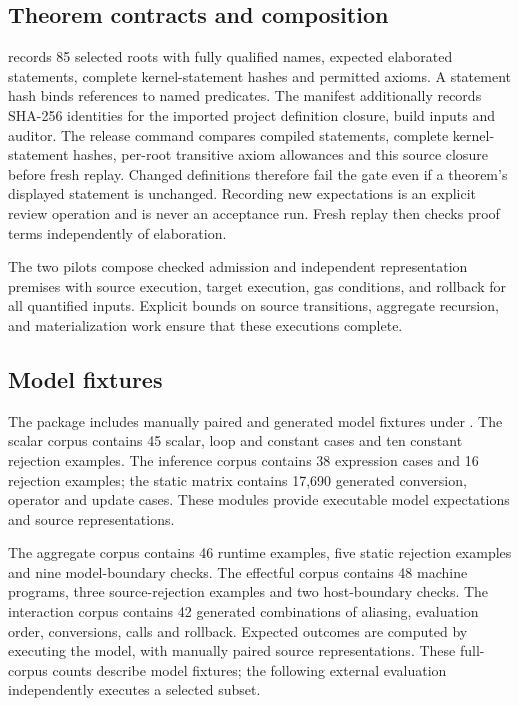 \documentclass[conference]{IEEEtran}
\begin{document}
\subsection{Theorem contracts and composition}
 records 85 selected roots with fully qualified names,
expected elaborated statements, complete kernel-statement hashes and permitted
axioms. A statement hash binds references to named predicates. The manifest additionally
records SHA-256 identities for the imported project definition closure, build
inputs and auditor. The release command compares compiled statements,
complete kernel-statement hashes, per-root transitive axiom allowances and this
source closure before fresh replay. Changed definitions therefore fail the gate
even if a theorem's displayed statement is unchanged. Recording new expectations
is an explicit review operation and is never an acceptance run. Fresh replay
then checks proof terms independently of elaboration.

The two pilots compose checked admission and independent representation
premises with source execution, target execution, gas conditions, and rollback
for all quantified inputs. Explicit bounds on source transitions, aggregate
recursion, and materialization work ensure that these executions complete.

\subsection{Model fixtures}
The package includes manually paired and generated model fixtures under
. The scalar corpus contains 45 scalar, loop and
constant cases and ten constant rejection examples. The inference corpus
contains 38 expression cases and 16 rejection examples; the static matrix
contains 17,690 generated conversion, operator and update cases. These modules
provide executable model expectations and source representations.

The aggregate corpus contains 46 runtime examples, five static rejection
examples and nine model-boundary checks. The effectful corpus contains 48
machine programs, three source-rejection examples and two host-boundary checks.
The interaction corpus contains 42 generated combinations of aliasing,
evaluation order, conversions, calls and rollback. Expected outcomes are
computed by executing the model, with manually paired source representations.
These full-corpus counts describe model fixtures; the following external
evaluation independently executes a selected subset.
\end{document}
